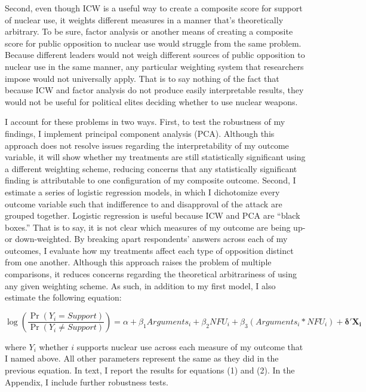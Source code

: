 \documentclass[12pt]{article}
\begin{document}
Second, even though ICW is a useful way to create a composite score for support of nuclear use, it weights different measures in a manner that's theoretically arbitrary. To be sure, factor analysis or another means of creating a composite score for public opposition to nuclear use would struggle from the same problem. Because different leaders would not weigh different sources of public opposition to nuclear use in the same manner, any particular weighting system that researchers impose would not universally apply. That is to say nothing of the fact that because ICW and factor analysis do not produce easily interpretable results, they would not be useful for political elites deciding whether to use nuclear weapons. 

I account for these problems in two ways. First, to test the robustness of my findings, I implement principal component analysis (PCA). Although this approach does not resolve issues regarding the interpretability of my outcome variable, it will show whether my treatments are still statistically significant using a different weighting scheme, reducing concerns that any statistically significant finding is attributable to one configuration of my composite outcome. Second, I estimate a series of logistic regression models, in which I dichotomize every outcome variable such that indifference to and disapproval of the attack are grouped together. Logistic regression is useful because ICW and PCA are “black boxes.” That is to say, it is not clear which measures of my outcome are being up- or down-weighted. By breaking apart respondents' answers across each of my outcomes, I evaluate how my treatments affect each type of opposition distinct from one another. Although this approach raises the problem of multiple comparisons, it reduces concerns regarding the theoretical arbitrariness of using any given weighting scheme. As such, in addition to my first model, I also estimate the following equation:

\begin{equation}
\log(\frac{\Pr(Y_i=Support)}{\Pr(Y_i\neq Support)})=\alpha+\beta_{1}Arguments_i+\beta_{2}NFU_{i}+\beta_{3}(Arguments_i*NFU_i)+\mathbf{\delta'X_i}
\end{equation}

\noindent
where $Y_i$ whether $i$ supports nuclear use across each measure of my outcome that I named above. All other parameters represent the same as they did in the previous equation. In text, I report the results for equations (1) and (2). In the Appendix, I include further robustness tests.
\end{document}
